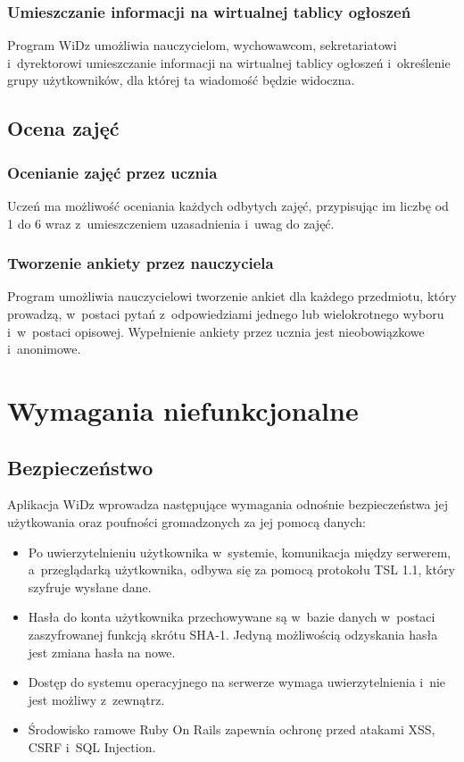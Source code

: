 \documentclass[12pt,leqno,twoside]{mwart}
\begin{document}
\subsubsection{Umieszczanie informacji na wirtualnej tablicy ogłoszeń}
\noindent Program WiDz umożliwia nauczycielom, wychowawcom, sekretariatowi i~dyrektorowi umieszczanie informacji na wirtualnej tablicy ogłoszeń i~określenie grupy użytkowników, dla której ta wiadomość będzie widoczna.

\subsection{Ocena zajęć}
\subsubsection{Ocenianie zajęć przez ucznia}
\noindent Uczeń ma możliwość oceniania każdych odbytych zajęć, przypisując im liczbę od 1 do 6 wraz z~umieszczeniem uzasadnienia i~uwag do zajęć.

\subsubsection{Tworzenie ankiety przez nauczyciela}
\noindent Program umożliwia nauczycielowi tworzenie ankiet dla każdego przedmiotu, który prowadzą, w~postaci pytań z~odpowiedziami jednego lub wielokrotnego wyboru i~w~postaci opisowej. Wypełnienie ankiety przez ucznia jest nieobowiązkowe i~anonimowe.

\section{Wymagania niefunkcjonalne}
\subsection{Bezpieczeństwo}
\noindent Aplikacja WiDz wprowadza następujące wymagania odnośnie bezpieczeństwa jej użytkowania oraz poufności gromadzonych za jej pomocą danych:
\begin{itemize}
	\item Po uwierzytelnieniu użytkownika w~systemie, komunikacja między serwerem, a~przeglądarką użytkownika, odbywa się za pomocą protokołu TSL 1.1, który szyfruje wysłane dane.
	\item Hasła do konta użytkownika przechowywane są w~bazie danych w~postaci zaszyfrowanej funkcją skrótu SHA-1. Jedyną możliwością odzyskania hasła jest zmiana hasła na nowe.
	\item Dostęp do systemu operacyjnego na serwerze wymaga uwierzytelnienia i~nie jest możliwy z~zewnątrz.
	\item Środowisko ramowe Ruby On Rails zapewnia ochronę przed atakami XSS, CSRF i~SQL Injection.
\end{itemize}
\end{document}
